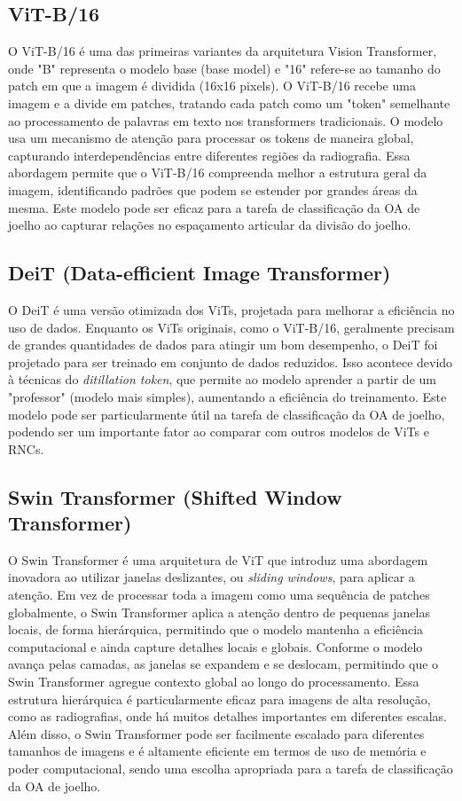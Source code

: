 \subsection{ViT-B/16}

O ViT-B/16 é uma das primeiras variantes da arquitetura Vision Transformer, onde "B" representa o modelo base (base model) e "16" refere-se ao tamanho do patch em que a imagem é dividida (16x16 pixels). O ViT-B/16 recebe uma imagem e a divide em patches, tratando cada patch como um "token" semelhante ao processamento de palavras em texto nos transformers tradicionais. O modelo usa um mecanismo de atenção para processar os tokens de maneira global, capturando interdependências entre diferentes regiões da radiografia. Essa abordagem permite que o ViT-B/16 compreenda melhor a estrutura geral da imagem, identificando padrões que podem se estender por grandes áreas da mesma. Este modelo pode ser eficaz para a tarefa de classificação da OA de joelho ao capturar relações no espaçamento articular da divisão do joelho.

\subsection{DeiT (Data-efficient Image Transformer)}

O DeiT é uma versão otimizada dos ViTs, projetada para melhorar a eficiência no uso de dados. Enquanto os ViTs originais, como o ViT-B/16, geralmente precisam de grandes quantidades de dados para atingir um bom desempenho, o DeiT foi projetado para ser treinado em conjunto de dados reduzidos. Isso acontece devido à técnicas do \textit{ditillation token}, que permite ao modelo aprender a partir de um "professor" (modelo mais simples), aumentando a eficiência do treinamento. Este modelo pode ser particularmente útil na tarefa de classificação da OA de joelho, podendo ser um importante fator ao comparar com outros modelos de ViTs e RNCs.

\subsection{Swin Transformer (Shifted Window Transformer)}

O Swin Transformer é uma arquitetura de ViT que introduz uma abordagem inovadora ao utilizar janelas deslizantes, ou \textit{sliding windows}, para aplicar a atenção. Em vez de processar toda a imagem como uma sequência de patches globalmente, o Swin Transformer aplica a atenção dentro de pequenas janelas locais, de forma hierárquica, permitindo que o modelo mantenha a eficiência computacional e ainda capture detalhes locais e globais. Conforme o modelo avança pelas camadas, as janelas se expandem e se deslocam, permitindo que o Swin Transformer agregue contexto global ao longo do processamento. Essa estrutura hierárquica é particularmente eficaz para imagens de alta resolução, como as radiografias, onde há muitos detalhes importantes em diferentes escalas. Além disso, o Swin Transformer pode ser facilmente escalado para diferentes tamanhos de imagens e é altamente eficiente em termos de uso de memória e poder computacional, sendo uma escolha apropriada para a tarefa de classificação da OA de joelho.